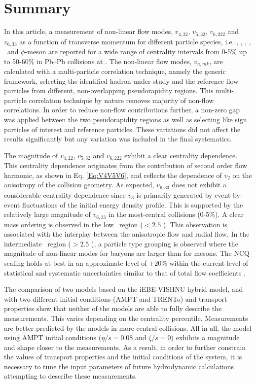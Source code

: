 \newpage

\section{Summary}
\label{Sec:conclusion}

In this article, a measurement of non-linear flow modes, $v_{4,22}$, $v_{5,32}$, $v_{6,222}$ and $v_{6,33}$ as a function of transverse momentum for different particle species, i.e. \pion, \kaon, \proton, \Ks, \lambdas~and $\phi$-meson are reported for a wide range of centrality intervals from 0-5\% up to 50-60\% in Pb--Pb collisions at \sNN. The non-linear flow modes, $v_{n,mk}$, are calculated with a multi-particle correlation technique, namely the generic framework, selecting the identified hadron under study and the reference flow particles from different, non-overlapping pseudorapidity regions. This multi-particle correlation technique by nature removes majority of non-flow correlations. In order to reduce non-flow contributions further, a non-zero gap was applied between the two pseudorapidity regions as well as selecting like sign particles of interest and reference particles. These variations did not affect the results significantly but any variation was included in the final systematics. 

The magnitude of $v_{4,22}$, $v_{5,32}$ and $v_{6,222}$ exhibit a clear centrality dependence. This centrality dependence originates from the contribution of second order flow harmonic, as shown in Eq. \ref{Eq:V4V5V6}, and reflects the dependence of $v_{2}$ on the anisotropy of the collision geometry. As expected, $v_{6,33}$ does not exhibit a considerable centrality dependence since $v_{3}$ is primarily generated by event-by-event fluctuations of the initial energy density profile. This is supported by the relatively large magnitude of $v_{6,33}$ in the most-central collisions (0-5\%). A clear mass ordering is observed in the low \pT~region (\pT$< 2.5$ \GeV). This observation is associated with the interplay between the anisotropic flow and radial flow. In the intermediate \pT~region (\pT$> 2.5$ \GeV), a particle type grouping is observed where the magnitude of non-linear modes for baryons are larger than for mesons. The NCQ scaling holds at best in an approximate level of $\pm 20$\% within the current level of statistical and systematic uncertainties similar to that of total flow coefficients \cite{Acharya:2018zuq}.

The comparison of two models based on the iEBE-VISHNU hybrid model, and with two different initial conditions (AMPT and TRENTo) and transport properties show that neither of the models are able to fully describe the measurements. This varies depending on the centrality percentile. Measurements are better predicted by the models in more central collisions. All in all, the model using AMPT initial conditions ($\eta/s = 0.08$ and $\zeta/s =0$) exhibits a magnitude and shape closer to the measurements. As a result, in order to further constrain the values of transport properties and the initial conditions of the system, it is necessary to tune the input parameters of future hydrodynamic calculations attempting to describe these measurements.